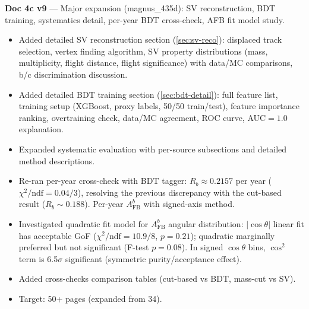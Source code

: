 \documentclass[11pt,a4paper]{article}
\begin{document}
\textbf{Doc 4c v9} --- Major expansion (magnus\_435d): SV reconstruction, BDT training,
systematics detail, per-year BDT cross-check, AFB fit model study.
\begin{itemize}
\item Added detailed SV reconstruction section (\cref{sec:sv-reco}): displaced track selection,
  vertex finding algorithm, SV property distributions (mass, multiplicity, flight distance,
  flight significance) with data/MC comparisons, b/c discrimination discussion.
\item Added detailed BDT training section (\cref{sec:bdt-detail}): full feature list,
  training setup (XGBoost, proxy labels, 50/50 train/test), feature importance ranking,
  overtraining check, data/MC agreement, ROC curve, AUC${}=1.0$ explanation.
\item Expanded systematic evaluation with per-source subsections and detailed method descriptions.
\item Re-ran per-year cross-check with BDT tagger: $R_b \approx 0.2157$ per year
  ($\chi^2/\mathrm{ndf} = 0.04/3$), resolving the previous discrepancy with the
  cut-based result ($R_b \sim 0.188$). Per-year $A_\mathrm{FB}^b$ with signed-axis method.
\item Investigated quadratic fit model for $A_\mathrm{FB}^b$ angular distribution:
  $|{\cos\theta}|$ linear fit has acceptable GoF ($\chi^2/\mathrm{ndf} = 10.9/8$,
  $p = 0.21$); quadratic marginally preferred but not significant (F-test $p = 0.08$).
  In signed $\cos\theta$ bins, $\cos^2$ term is 6.5$\sigma$ significant (symmetric
  purity/acceptance effect).
\item Added cross-checks comparison tables (cut-based vs BDT, mass-cut vs SV).
\item Target: 50+ pages (expanded from 34).
\end{itemize}
\end{document}
